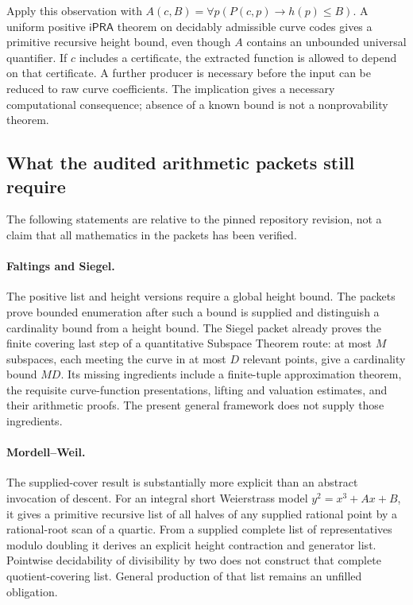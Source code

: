 Apply this observation with
$A(c,B)=\forall p(P(c,p)\to h(p)\le B)$. A uniform positive
$\mathsf{iPRA}$ theorem on decidably admissible curve codes gives a
primitive recursive height bound, even though $A$ contains an unbounded
universal quantifier. If $c$ includes a certificate, the extracted
function is allowed to depend on that certificate. A further producer
is necessary before the input can be reduced to raw curve coefficients.
The implication gives a necessary computational consequence; absence
of a known bound is not a nonprovability theorem.

\subsection{What the audited arithmetic packets still require}

The following statements are relative to the pinned repository revision,
not a claim that all mathematics in the packets has been verified.

\paragraph{Faltings and Siegel.}
The positive list and height versions require a global height bound.
The packets prove bounded enumeration after such a bound is supplied
and distinguish a cardinality bound from a height bound. The Siegel
packet already proves the finite covering last step of a quantitative
Subspace Theorem route: at most $M$ subspaces, each meeting the curve
in at most $D$ relevant points, give a cardinality bound $MD$. Its
missing ingredients include a finite-tuple approximation theorem,
the requisite curve-function presentations, lifting and valuation
estimates, and their arithmetic proofs. The present general framework
does not supply those ingredients.

\paragraph{Mordell--Weil.}
The supplied-cover result is substantially more explicit than an
abstract invocation of descent. For an integral short Weierstrass model
$y^2=x^3+Ax+B$, it gives a primitive recursive list of all halves of
any supplied rational point by a rational-root scan of a quartic. From
a supplied complete list of representatives modulo doubling it derives
an explicit height contraction and generator list. Pointwise
decidability of divisibility by two does not construct that complete
quotient-covering list. General production of that list remains an
unfilled obligation.

